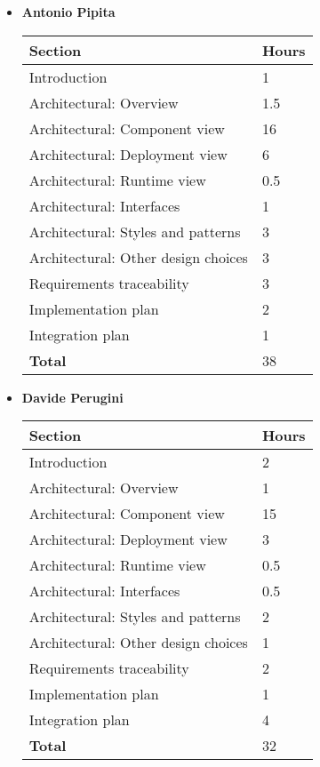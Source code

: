 \begin{itemize}
\item \textbf{Antonio Pipita}

\begin{table}[!h]
\centering
\begin{tabular}{|l|l|}
\hline
\textbf{Section}														&		\textbf{Hours}  \\ \hline
Introduction														&  	1	\\ \hline
Architectural: Overview						& 		1.5 	\\ \hline
Architectural: Component view						& 		16 	\\ \hline
Architectural: Deployment view						& 		6 	\\ \hline
Architectural: Runtime view						& 	0.5	 	\\ \hline
Architectural: Interfaces						& 	1	 	\\ \hline
Architectural: Styles and patterns					& 	3	 	\\ \hline
Architectural: Other design choices					& 	3	 	\\ \hline
Requirements traceability					& 	3	 	\\ \hline
Implementation plan					& 		2 	\\ \hline
Integration plan					& 		1	\\ \hline
\textbf{Total}															& 38 	\\ \hline
\end{tabular}
\end{table}

\item \textbf{Davide Perugini}

\begin{table}[!h]
	\centering
	\begin{tabular}{|l|l|}
		\hline
		\textbf{Section}														&		\textbf{Hours}  \\ \hline
		Introduction								&  	2	\\ \hline
		Architectural: Overview						& 	1	 	\\ \hline
		Architectural: Component view				& 	15	 	\\ \hline
		Architectural: Deployment view				& 	3	 	\\ \hline
		Architectural: Runtime view					& 	0.5	 	\\ \hline
		Architectural: Interfaces					& 	0.5	 	\\ \hline
		Architectural: Styles and patterns			& 	2	 	\\ \hline
		Architectural: Other design choices			& 	1	 	\\ \hline
		Requirements traceability					& 	2	 	\\ \hline
		Implementation plan					& 		1		 	\\ \hline
		Integration plan					& 		4		 	\\ \hline
		\textbf{Total}						&  		32			\\ \hline
	\end{tabular}
\end{table}


\end{itemize}
